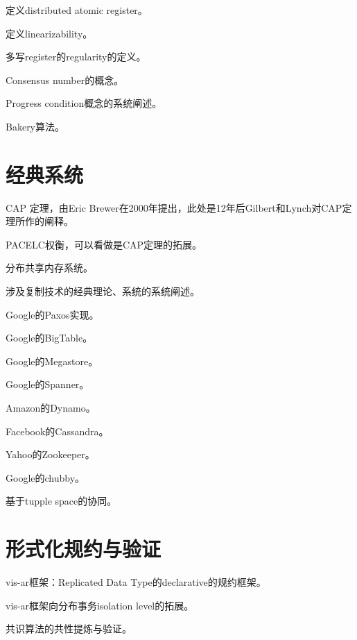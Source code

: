 \documentclass[UTF8]{ctexrep}
\begin{document}
\cite{Attiya95} 定义distributed atomic register。

\cite{Herlihy90} 定义linearizability。

\cite{Shao11} 多写register的regularity的定义。

\cite{Herlihy91} Consensus number的概念。

\cite{Herlihy11} Progress condition概念的系统阐述。

\cite{Lamport74} Bakery算法。


\chapter{经典系统}

\cite{Gilbert12} CAP 定理，由Eric Brewer在2000年提出，此处是12年后Gilbert和Lynch对CAP定理所作的阐释。

\cite{Abadi12} PACELC权衡，可以看做是CAP定理的拓展。

\cite{Li89} 分布共享内存系统。

\cite{Charron10} 涉及复制技术的经典理论、系统的系统阐述。

\cite{Chandra07} Google的Paxos实现。

\cite{Chang08} Google的BigTable。

\cite{Baker11} Google的Megastore。

\cite{Corbett12} Google的Spanner。

\cite{DeCandia07} Amazon的Dynamo。

\cite{Lakshman10} Facebook的Cassandra。

\cite{Hunt10} Yahoo的Zookeeper。

\cite{Burrows06} Google的chubby。

\cite{Gelernter85} 基于tupple space的协同。

\chapter{形式化规约与验证}

\cite{Burckhardt14-book} vis-ar框架：Replicated Data Type的declarative的规约框架。

\cite{Cerone18} vis-ar框架向分布事务isolation level的拓展。

\cite{Maric17} 共识算法的共性提炼与验证。


%

\end{document}

